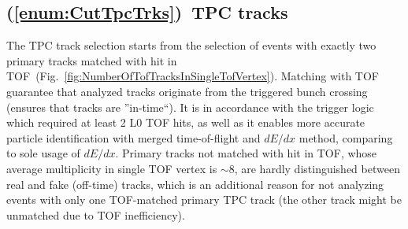 \subsection{(\ref{enum:CutTpcTrks})~TPC tracks}\label{sec:C3}

The TPC track selection starts from the selection of events with exactly two primary tracks matched with hit in TOF~(Fig.~\ref{fig:NumberOfTofTracksInSingleTofVertex}). Matching with TOF guarantee that analyzed tracks originate from the triggered bunch crossing (ensures that tracks are ''in-time``). It is in accordance with the trigger logic which required at least 2 L0 TOF hits, as well as it enables more accurate particle identification with merged time-of-flight and $dE/dx$ method, comparing to sole usage of $dE/dx$. Primary tracks not matched with hit in TOF, whose average multiplicity in single TOF vertex is $\sim$8, are hardly distinguished between real and fake (off-time) tracks, which is an additional reason for not analyzing events with only one TOF-matched primary TPC track (the other track might be unmatched due to TOF inefficiency).

